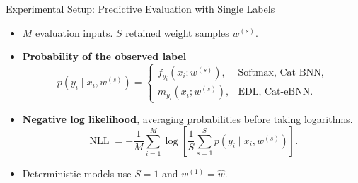 \begin{frame}{Experimental Setup: Predictive Evaluation with Single Labels}
\label{frm:appendix-setup-predictive-evaluation}
\setlength{\abovedisplayskip}{5pt}
\setlength{\belowdisplayskip}{5pt}
\begin{itemize}
\setlength{\itemsep}{4mm}
\item $M$ evaluation inputs. $S$ retained weight samples $w^{(s)}$.
\item \textbf{Probability of the observed label}
\[
p(y_i\mid x_i,w^{(s)})=
\begin{cases}
f_{y_i}(x_i;w^{(s)}), & \text{Softmax, Cat-BNN},\\[2mm]
m_{y_i}(x_i;w^{(s)}), & \text{EDL, Cat-eBNN}.
\end{cases}
\]
\item \textbf{Negative log likelihood}, averaging probabilities before taking logarithms.
\[
\operatorname{NLL}
=-\frac{1}{M}\sum_{i=1}^{M}
\log\!\left[\frac{1}{S}\sum_{s=1}^{S}p(y_i\mid x_i,w^{(s)})\right].
\]
\item Deterministic models use $S=1$ and $w^{(1)}=\hat w$.
\end{itemize}
\end{frame}

